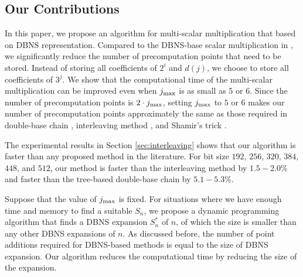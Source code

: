 \subsection{Our Contributions}

In this paper, we propose an algorithm for multi-scalar multiplication that based on DBNS representation.
Compared to the DBNS-base scalar multiplication in \cite{MH09},
we significantly reduce the number of precomputation points that need to be stored.
Instead of storing all coefficients of $2^i$ and $d(j)$, we choose to store all coefficients of $3^j$.
We show that the computational time of the multi-scalar multiplication can be improved even when $j_{\rm max}$ is as small as $5$ or $6$.
Since the number of precomputation points is $2 \cdot j_{\rm max}$,
setting $j_{\rm max}$ to $5$ or $6$ makes our number of precomputation points approximately the same as those required in
double-base chain \cite{experiment,DKS09}, interleaving method \cite{interleaving}, and Shamir's trick \cite{enlarged4}.

The experimental results in Section \ref{sec:interleaving} shows that our algorithm is faster than any proposed method in the literature.
For bit size $192$, $256$, $320$, $384$, $448$, and $512$,
our method is faster than the interleaving method by $1.5 - 2.0\%$
and faster than the tree-based double-base chain by $5.1 - 5.3\%$.

Suppose that the value of $j_{\rm max}$ is fixed.
For situations where we have enough time and memory to find a suitable $S_n$,
we propose a dynamic programming algorithm that finds a DBNS expansion $S^*_n$ of $n$, of which the size is smaller than any other DBNS expansions of $n$.
As discussed before, the number of point additions required for DBNS-based methods is equal to the size of DBNS expansion.
Our algorithm reduces the computational time by reducing the size of the expansion.


